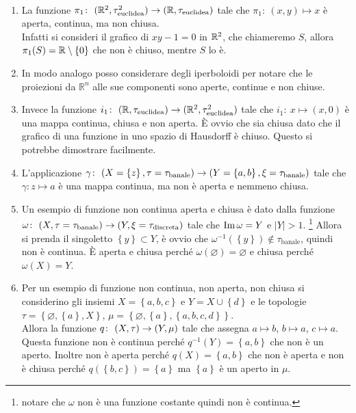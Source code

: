 \begin{example} \
\begin{enumerate}
	\item La funzione $\pi_1 \colon\ (\mathbb{R}^2,\tau^2_{\text{euclidea}}) \rightarrow (\mathbb{R},\tau_{\text{euclidea}})$ tale che $\pi_1 \colon\ (x,y) \mapsto x$ è aperta, continua, ma non chiusa. \\ Infatti si consideri il grafico di $xy - 1 = 0$ in $\mathbb{R}^2$, che chiameremo $S$, allora $\pi_1(S) = \mathbb{R} \setminus \left\{0\right\}$ che non è chiuso, mentre $S$ lo è.
	\item In modo analogo posso considerare degli iperboloidi per notare che le proiezioni da $\mathbb{R}^n$ alle sue componenti sono aperte, continue e non chiuse.
	\item Invece la funzione $i_1 \colon\ (\mathbb{R},\tau_{\text{euclidea}}) \rightarrow (\mathbb{R}^2,\tau^2_{\text{euclidea}})$ tale che $i_1 \colon\ x \mapsto (x,0)$ è una mappa continua, chiusa e non aperta. È ovvio che sia chiusa dato che il grafico di una funzione in uno spazio di Hausdorff è chiuso. Questo si potrebbe dimostrare facilmente.
	\item L'applicazione $\gamma \colon\ (X = \left\{z\right\},\tau =\tau_{\text{banale}}) \rightarrow (Y = \left\{a,b\right\},\xi = \tau_{\text{banale}})$ tale che  $\gamma \colon z \mapsto a$ è una mappa continua, ma non è aperta e nemmeno chiusa.
	\item Un esempio di funzione non continua aperta e chiusa è dato dalla funzione $\omega \colon\ (X,\tau =\tau_{\text{banale}}) \rightarrow (Y,\xi = \tau_{\text{discreta}})$ tale che $\operatorname{Im}{\omega} = Y$ e $|Y| > 1$.
	\footnote{notare che $\omega$ non è una funzione costante quindi non è continua.}
	 Allora si prenda il singoletto $\left\{y\right\} \subset Y$, è ovvio che $\omega^{-1}(\left\{y\right\}) \notin \tau_{\text{banale}}$, quindi non è continua. È aperta e chiusa perché $\omega(\varnothing) = \varnothing$ e chiusa perché $\omega(X) = Y$.
	\item Per un esempio di funzione non continua, non aperta, non chiusa si considerino gli insiemi $X = \left\{a,b,c\right\}$ e $Y = X \cup \left\{d\right\}$ e le topologie $\tau = \left\{\varnothing, \left\{a\right\}, X\right\}$, $\mu = \left\{ \varnothing, \left\{a\right\}, \left\{a,b,c,d\right\}\right\}$. \\ Allora la funzione $q \colon\ (X,\tau) \rightarrow (Y,\mu)$ tale che assegna $a \mapsto b$, $b \mapsto a$, $c \mapsto a$. Questa funzione non è continua perché $q^{-1}(Y) = \left\{a,b\right\}$ che non è un aperto. Inoltre non è aperta perché $q(X) = \left\{a,b\right\}$ che non è aperta e non è chiusa perché $q(\left\{b,c\right\}) = \left\{a\right\}$ ma $\left\{a\right\}$ è un aperto in $\mu$.

\end{enumerate}
\end{example}
